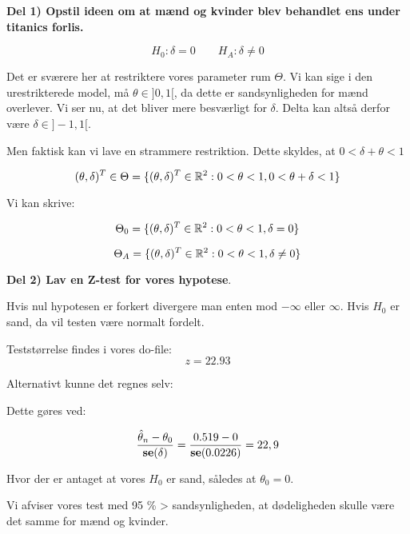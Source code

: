\textbf{Del 1) Opstil ideen om at mænd og kvinder blev behandlet ens under titanics forlis.}

\begin{equation}
    H_0 : \delta = 0\qquad H_A : \delta \neq 0
\end{equation}

Det er sværere her at restriktere vores parameter rum $\Theta$. Vi kan sige i den urestrikterede model, må $\theta \in ]0,1[$, da dette er sandsynligheden for mænd overlever. Vi ser nu, at det bliver mere besværligt for $\delta$. Delta kan altså derfor være $\delta \in ]-1, 1[$.

Men faktisk kan vi lave en strammere restriktion. Dette skyldes, at $0< \delta + \theta < 1$

\begin{equation}
    (\theta, \delta)^{T} \in \Theta = \{(\theta, \delta)^{T} \in \mathbb{R}^2: 0 < \theta < 1, 0 < \theta + \delta < 1\}
\end{equation}

Vi kan skrive:

\begin{equation}
    \Theta_0 = \{(\theta, \delta)^T \in \mathbb{R}^2 : 0 < \theta < 1, \delta = 0 \}
\end{equation}

\begin{equation}
    \Theta_A = \{(\theta, \delta)^T \in \mathbb{R}^2 : 0 < \theta < 1, \delta \neq 0 \}
\end{equation}

\textbf{Del 2) Lav en Z-test for vores hypotese}.

Hvis nul hypotesen er forkert divergere man enten mod $-\infty$ eller $\infty$. Hvis $H_0$ er sand, da vil testen være normalt fordelt.

Teststørrelse findes i vores do-file:
\begin{equation}
    z = 22.93
\end{equation}

Alternativt kunne det regnes selv:

Dette gøres ved:

\begin{equation}
    \frac{\hat{\theta}_n - \theta_0}{\textbf{se}(\delta)} = \frac{0.519 - 0}{\textbf{se}(0.0226)} = 22,9
\end{equation}

Hvor der er antaget at vores $H_0$ er sand, således at $\theta_0 = 0$.

Vi afviser vores test med 95 \% > sandsynligheden, at dødeligheden skulle være det samme for mænd og kvinder.

